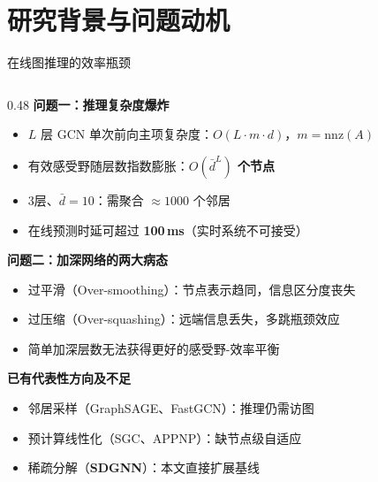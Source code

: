 \documentclass[aspectratio=169,9pt,xcolor=dvipsnames]{beamer}
\newcommand{\highlight}[1]{\textcolor{myred}{\textbf{#1}}}
\newcommand{\blue}[1]{\textcolor{mynavy}{#1}}
\newcommand{\chapternote}{}
\newif\ifshowchapternote
\newcommand{\setchapternote}[1]{%
  \renewcommand{\chapternote}{#1}%
  \showchapternotetrue
}
\begin{document}
\section{研究背景与问题动机}
\setchapternote{第1--2章}

\begin{frame}{在线图推理的效率瓶颈}
  \begin{columns}[T]
    \begin{column}{0.48\textwidth}
      \textbf{\highlight{问题一：推理复杂度爆炸}}
      \begin{itemize}
        \item $L$ 层 GCN 单次前向主项复杂度：$O(L\cdot m\cdot d)$，$m=\mathrm{nnz}(A)$
        \item 有效感受野随层数指数膨胀：\highlight{$O(\bar{d}^L)$ 个节点}
        \item 3层、$\bar{d}=10$：需聚合 $\approx1000$ 个邻居
        \item 在线预测时延可超过 \highlight{100\,ms}（实时系统不可接受）
      \end{itemize}

      \vspace{0.25cm}
      \textbf{\highlight{问题二：加深网络的两大病态}}
      \begin{itemize}
        \item \blue{过平滑（Over-smoothing）}：节点表示趋同，信息区分度丧失
        \item \blue{过压缩（Over-squashing）}：远端信息丢失，多跳瓶颈效应
        \item 简单加深层数无法获得更好的感受野-效率平衡
      \end{itemize}

      \vspace{0.25cm}
      \textbf{已有代表性方向及不足}
      \begin{itemize}
        \item 邻居采样（GraphSAGE、FastGCN）：推理仍需访图
        \item 预计算线性化（SGC、APPNP）：缺节点级自适应
        \item 稀疏分解（\highlight{SDGNN}）：本文直接扩展基线
      \end{itemize}
    \end{column}


\end{columns}
\end{frame}
\end{document}
